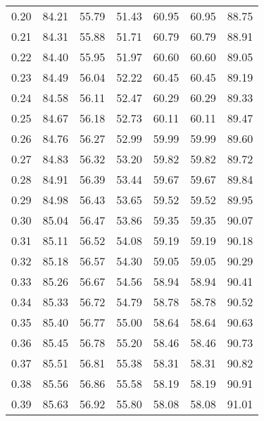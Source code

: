 \begin{tabular}{|c|c|c|c|c|c|c|}
      0.20 &     84.21 &     55.79 &      51.43 &   60.95 &      60.95 &         88.75 \\
      0.21 &     84.31 &     55.88 &      51.71 &   60.79 &      60.79 &         88.91 \\
      0.22 &     84.40 &     55.95 &      51.97 &   60.60 &      60.60 &         89.05 \\
      0.23 &     84.49 &     56.04 &      52.22 &   60.45 &      60.45 &         89.19 \\
      0.24 &     84.58 &     56.11 &      52.47 &   60.29 &      60.29 &         89.33 \\
      0.25 &     84.67 &     56.18 &      52.73 &   60.11 &      60.11 &         89.47 \\
      0.26 &     84.76 &     56.27 &      52.99 &   59.99 &      59.99 &         89.60 \\
      0.27 &     84.83 &     56.32 &      53.20 &   59.82 &      59.82 &         89.72 \\
      0.28 &     84.91 &     56.39 &      53.44 &   59.67 &      59.67 &         89.84 \\
      0.29 &     84.98 &     56.43 &      53.65 &   59.52 &      59.52 &         89.95 \\
      0.30 &     85.04 &     56.47 &      53.86 &   59.35 &      59.35 &         90.07 \\
      0.31 &     85.11 &     56.52 &      54.08 &   59.19 &      59.19 &         90.18 \\
      0.32 &     85.18 &     56.57 &      54.30 &   59.05 &      59.05 &         90.29 \\
      0.33 &     85.26 &     56.67 &      54.56 &   58.94 &      58.94 &         90.41 \\
      0.34 &     85.33 &     56.72 &      54.79 &   58.78 &      58.78 &         90.52 \\
      0.35 &     85.40 &     56.77 &      55.00 &   58.64 &      58.64 &         90.63 \\
      0.36 &     85.45 &     56.78 &      55.20 &   58.46 &      58.46 &         90.73 \\
      0.37 &     85.51 &     56.81 &      55.38 &   58.31 &      58.31 &         90.82 \\
      0.38 &     85.56 &     56.86 &      55.58 &   58.19 &      58.19 &         90.91 \\
      0.39 &     85.63 &     56.92 &      55.80 &   58.08 &      58.08 &         91.01 \\

\end{tabular}
